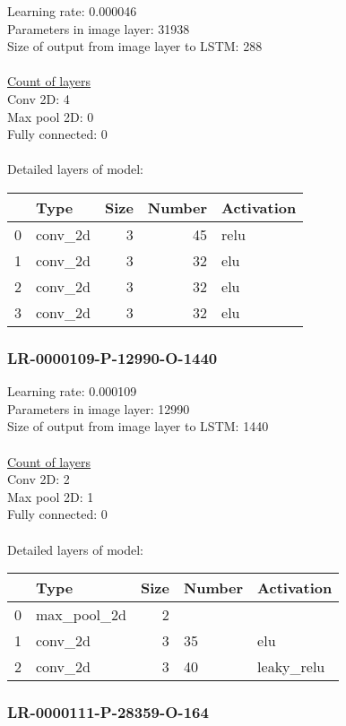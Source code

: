 Learning rate: 0.000046
\\Parameters in image layer: 31938
\\Size of output from image layer to LSTM: 288
\\\\\underline{Count of layers} 
\\Conv 2D:           4\\Max pool 2D:      0\\Fully connected:  0
\\\\Detailed layers of model: \\\begin{tabular}{rlrrl}
\hline
    & Type    &   Size &   Number & Activation   \\
\hline
  0 & conv\_2d &      3 &       45 & relu         \\
  1 & conv\_2d &      3 &       32 & elu          \\
  2 & conv\_2d &      3 &       32 & elu          \\
  3 & conv\_2d &      3 &       32 & elu          \\
\hline
\end{tabular}\subsubsection*{LR-0000109-P-12990-O-1440}
Learning rate: 0.000109
\\Parameters in image layer: 12990
\\Size of output from image layer to LSTM: 1440
\\\\\underline{Count of layers} 
\\Conv 2D:           2\\Max pool 2D:      1\\Fully connected:  0
\\\\Detailed layers of model: \\\begin{tabular}{rlrll}
\hline
    & Type        &   Size & Number   & Activation   \\
\hline
  0 & max\_pool\_2d &      2 &          &              \\
  1 & conv\_2d     &      3 & 35       & elu          \\
  2 & conv\_2d     &      3 & 40       & leaky\_relu   \\
\hline
\end{tabular}\subsubsection*{LR-0000111-P-28359-O-164}
